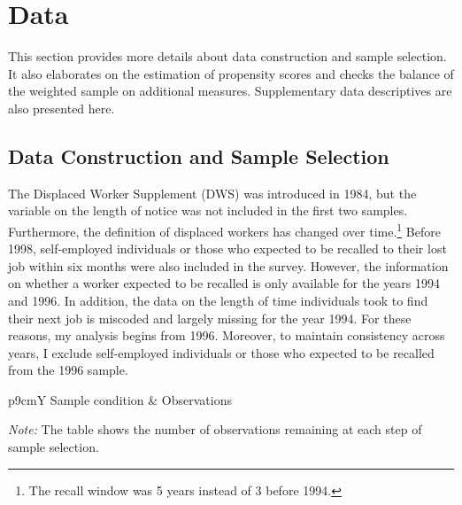 \documentclass{div}
\newcommand{\outdir}{./../output}
\begin{document}

\clearpage
\setcounter{table}{0}
\setcounter{figure}{0}
\section{Data}\label{app_data}
This section provides more details about data construction and sample selection. It also elaborates on the estimation of propensity scores and checks the balance of the weighted sample on additional measures. Supplementary data descriptives are also presented here.

\subsection{Data Construction and Sample Selection}\label{app_data_cnstr}

The Displaced Worker Supplement (DWS) was introduced in 1984, but the variable on the length of notice was not included in the first two samples. Furthermore, the definition of displaced workers has changed over time.\footnote{The recall window was 5 years instead of 3 before 1994.} Before 1998, self-employed individuals or those who expected to be recalled to their lost job within six months were also included in the survey. However, the information on whether a worker expected to be recalled is only available for the years 1994 and 1996. In addition, the data on the length of time individuals took to find their next job is miscoded and largely missing for the year 1994. For these reasons, my analysis begins from 1996. Moreover, to maintain consistency across years, I exclude self-employed individuals or those who expected to be recalled from the 1996 sample.

\begin{table}[p]
\begin{threeparttable}
\caption{Sample Selection}\label{tab_sample}
\begin{tabularx}{\textwidth}{p{9cm}Y}
\toprule
Sample condition & Observations  \\ \midrule

\bottomrule
\end{tabularx}
\begin{tablenotes}
\item  \textit{Note:} The table shows the number of observations remaining at each step of sample selection. 
\end{tablenotes}
\end{threeparttable}
\end{table}
\end{document}
